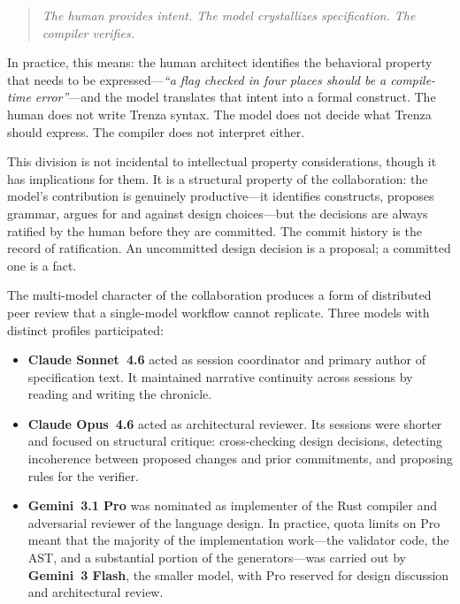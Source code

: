 \begin{quote}
\itshape
The human provides intent. The model crystallizes specification. The compiler
verifies.
\end{quote}

In practice, this means: the human architect identifies the behavioral property
that needs to be expressed---\emph{``a flag checked in four places should be a
compile-time error''}---and the model translates that intent into a formal
construct. The human does not write Trenza syntax. The model does not decide
what Trenza should express. The compiler does not interpret either.

This division is not incidental to intellectual property considerations, though
it has implications for them. It is a structural property of the collaboration:
the model's contribution is genuinely productive---it identifies constructs,
proposes grammar, argues for and against design choices---but the decisions are
always ratified by the human before they are committed. The commit history is
the record of ratification. An uncommitted design decision is a proposal; a
committed one is a fact.

The multi-model character of the collaboration produces a form of distributed
peer review that a single-model workflow cannot replicate. Three models with
distinct profiles participated:

\begin{itemize}
  \item \textbf{Claude Sonnet~4.6} acted as session coordinator and primary
        author of specification text. It maintained narrative continuity across
        sessions by reading and writing the chronicle.
  \item \textbf{Claude Opus~4.6} acted as architectural reviewer. Its sessions
        were shorter and focused on structural critique: cross-checking design
        decisions, detecting incoherence between proposed changes and prior
        commitments, and proposing rules for the verifier.
  \item \textbf{Gemini~3.1 Pro} was nominated as implementer of the Rust compiler
        and adversarial reviewer of the language design. In practice, quota
        limits on Pro meant that the majority of the implementation
        work---the validator code, the AST, and a substantial portion of the
        generators---was carried out by \textbf{Gemini~3 Flash}, the smaller
        model, with Pro reserved for design discussion and architectural review.
\end{itemize}

